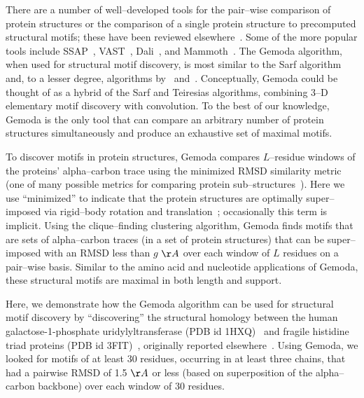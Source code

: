     There are a number of well--developed tools for
    the pair--wise comparison of protein structures
    or the comparison of a single protein structure to
    precomputed structural motifs; these have been reviewed
    elsewhere~\citep{eidhammer2000structure}.
    Some of the more popular tools
    include SSAP~\citep{orengo1996ssap},
    VAST~\citep{madej1995threading},
    Dali~\citep{holm1993protein},
    and Mammoth~\citep{ortiz2002mammoth}.
    The Gemoda algorithm, when used for structural
    motif discovery, is most similar to the
    Sarf algorithm~\citep{alexandrov1996sarfing,alexandrov1996analysis}
    and, to a lesser degree, algorithms
    by~\citep{hunter2003protein}
    and~\citep{jonassen2002structure}.
    Conceptually, Gemoda could be thought of as a hybrid
    of the Sarf and Teiresias algorithms, combining
    3--D elementary motif discovery with convolution.
    To the best of our knowledge, Gemoda is the only tool that can
    compare an arbitrary number of protein structures
    simultaneously and produce an exhaustive set of
    maximal motifs.

    To discover motifs in protein structures,
    Gemoda compares $L$--residue windows of the
    proteins' alpha--carbon trace using the
    minimized RMSD similarity metric (one of
    many possible metrics for comparing protein
    sub--structures~\citep{kolodny2005comprehensive}).
    Here we use ``minimized'' to indicate
    that the protein structures are optimally
    super--imposed via rigid--body rotation and
    translation~\citep{horn1987closed,arun1987least};
    occasionally this term is implicit.  Using the
    clique--finding clustering algorithm, Gemoda finds
    motifs that are sets of alpha--carbon traces (in
    a set of protein structures) that can be super--imposed
    with an RMSD less than $g$ $\AA$ over each window
    of $L$ residues on a
    pair--wise basis.  Similar to the amino acid and
    nucleotide applications of Gemoda, these structural
    motifs are maximal in both length and support.

    Here, we demonstrate how the Gemoda algorithm
    can be used for structural motif discovery by
    ``discovering'' the structural homology between the
    human galactose-1-phosphate uridylyltransferase
    (PDB id 1HXQ)~\citep{wedekind1996structure}
    and fragile histidine triad proteins (PDB id
    3FIT)~\citep{lima1997mad}, originally reported
    elsewhere~\citep{holm1997enzyme}.  Using Gemoda,
    we looked for motifs of at least 30 residues,
    occurring in at least three chains, that had a
    pairwise RMSD of 1.5 $\AA$ or less (based on
    superposition of the alpha--carbon backbone)
    over each window of 30 residues.

